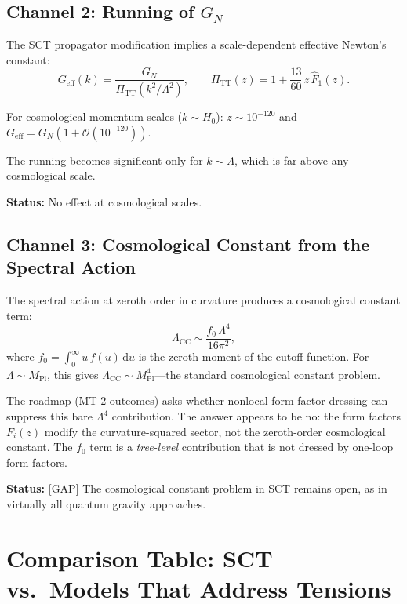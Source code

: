 \documentclass[11pt,a4paper]{article}
\theoremstyle{plain}
\theoremstyle{definition}
\theoremstyle{remark}
\renewcommand{\dd}{\mathrm{d}}
\newcommand{\gap}{\textcolor{red!80!black}{\textsf{[GAP]}}}
\begin{document}
\subsection{Channel 2: Running of $G_N$}

The SCT propagator modification implies a scale-dependent effective
Newton's constant:
\begin{equation}\label{eq:G-running}
  G_{\mathrm{eff}}(k) = \frac{G_N}{\Pi_{\mathrm{TT}}(k^2/\Lambda^2)},
  \qquad
  \Pi_{\mathrm{TT}}(z) = 1 + \frac{13}{60}\,z\,\hat{F}_1(z).
\end{equation}

For cosmological momentum scales ($k \sim H_0$):
$z \sim 10^{-120}$ and $G_{\mathrm{eff}} = G_N(1 + \mathcal{O}(10^{-120}))$.

The running becomes significant only for $k \sim \Lambda$, which is
far above any cosmological scale.

\textbf{Status:} No effect at cosmological scales.

\subsection{Channel 3: Cosmological Constant from the Spectral Action}

The spectral action at zeroth order in curvature produces a cosmological
constant term:
\begin{equation}\label{eq:Lambda-CC}
  \Lambda_{\mathrm{CC}} \sim \frac{f_0\,\Lambda^4}{16\pi^2},
\end{equation}
where $f_0 = \int_0^\infty u\,f(u)\,\dd u$ is the zeroth moment of the
cutoff function. For $\Lambda \sim M_{\mathrm{Pl}}$, this gives
$\Lambda_{\mathrm{CC}} \sim M_{\mathrm{Pl}}^4$---the standard
cosmological constant problem.

The roadmap (MT-2 outcomes) asks whether nonlocal form-factor dressing
can suppress this bare $\Lambda^4$ contribution. The answer appears to
be no: the form factors $F_i(z)$ modify the curvature-squared sector,
not the zeroth-order cosmological constant. The $f_0$ term is a
\emph{tree-level} contribution that is not dressed by one-loop form
factors.

\textbf{Status:} \gap{} The cosmological constant problem in SCT
remains open, as in virtually all quantum gravity approaches.

\section{Comparison Table: SCT vs.\ Models That Address Tensions}
\label{sec:comparison-table}
\end{document}
